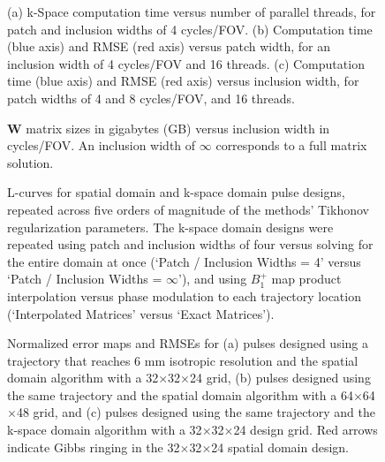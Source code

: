 \documentclass[11pt]{article}
\begin{document}
\begin{figure}
	\centering
	\caption{(a) k-Space computation time versus number of parallel threads, for patch and inclusion widths of 4 cycles/FOV. 
	(b) Computation time (blue axis) and RMSE (red axis) versus patch width, for an inclusion width of 4 cycles/FOV and 16 threads. 
	(c) Computation time (blue axis) and RMSE (red axis) versus inclusion width, for patch widths of 4 and 8 cycles/FOV, and 16 threads.}
	\label{fig:ComputationTime}
\end{figure}

\begin{figure}
\centering
\caption{$\bm{W}$ matrix sizes in gigabytes (GB) versus inclusion width in cycles/FOV. 
An inclusion width of $\infty$ corresponds to a full matrix solution.}
\label{fig:wsize}
\end{figure}

\begin{figure}
	\centering
	\caption{L-curves for spatial domain and k-space domain pulse designs, 
	repeated across five orders of magnitude of the methods' Tikhonov regularization parameters.
	The k-space domain designs were repeated using patch and inclusion widths of four versus solving for the entire domain at once (`Patch / Inclusion Widths = 4' versus `Patch / Inclusion Widths = $\infty$'),
	and using $B_1^+$ map product interpolation versus phase modulation to each trajectory location (`Interpolated Matrices' versus
	`Exact Matrices').}
	\label{fig:LCurves}
\end{figure}


\begin{figure}
	\centering
	\caption{Normalized error maps and RMSEs for 
	(a) pulses designed using a trajectory that reaches 6 mm isotropic resolution
	and the spatial domain algorithm with a 32$\times$32$\times$24 grid, 
	(b) pulses designed using the same trajectory and the spatial domain algorithm with a 64$\times$64$\times$48 grid,  
	and (c) pulses designed using the same trajectory and the k-space domain algorithm with a 32$\times$32$\times$24 design grid. 
	Red arrows indicate Gibbs ringing in the 32$\times$32$\times$24 spatial domain design.}
	\label{fig:GibbsRing}
\end{figure}
\end{document}
